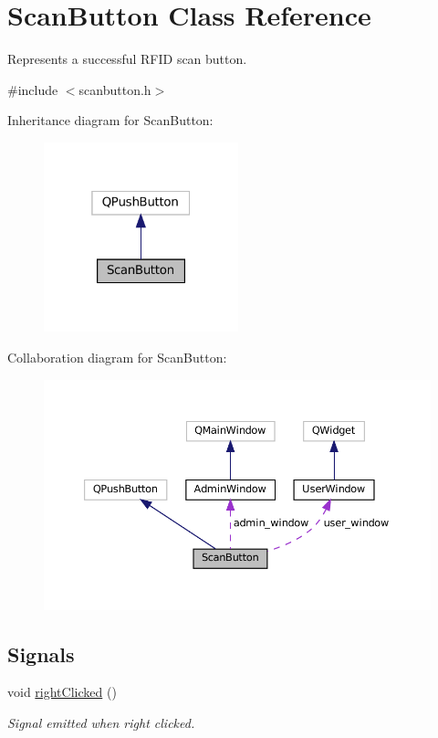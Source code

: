 \hypertarget{classScanButton}{}\section{Scan\+Button Class Reference}
\label{classScanButton}


Represents a successful R\+F\+ID scan button.  




{\ttfamily \#include $<$scanbutton.\+h$>$}



Inheritance diagram for Scan\+Button\+:\nopagebreak
\begin{figure}[H]
\begin{center}
\leavevmode
\includegraphics[width=160pt]{classScanButton__inherit__graph}
\end{center}
\end{figure}


Collaboration diagram for Scan\+Button\+:\nopagebreak
\begin{figure}[H]
\begin{center}
\leavevmode
\includegraphics[width=350pt]{classScanButton__coll__graph}
\end{center}
\end{figure}
\subsection*{Signals}
\begin{DoxyCompactItemize}
\item 
\mbox{\label{classScanButton_a6992033b8da2e3182f2956ab346b9a5a}} 
void \hyperlink{classScanButton_a6992033b8da2e3182f2956ab346b9a5a}{right\+Clicked} ()
\begin{DoxyCompactList}\small\item\em Signal emitted when right clicked. \end{DoxyCompactList}\end{DoxyCompactItemize}
